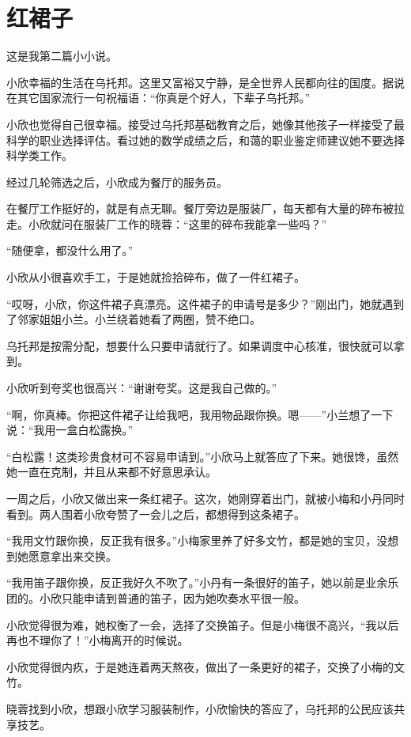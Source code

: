 \newpage
\chapter{红裙子}

\begin{quoting}
这是我第二篇小小说。
\end{quoting}

小欣幸福的生活在乌托邦。这里又富裕又宁静，是全世界人民都向往的国度。据说在其它国家流行一句祝福语：“你真是个好人，下辈子乌托邦。”

小欣也觉得自己很幸福。接受过乌托邦基础教育之后，她像其他孩子一样接受了最科学的职业选择评估。看过她的数学成绩之后，和蔼的职业鉴定师建议她不要选择科学类工作。

经过几轮筛选之后，小欣成为餐厅的服务员。

\zPar
在餐厅工作挺好的，就是有点无聊。餐厅旁边是服装厂，每天都有大量的碎布被拉走。小欣就问在服装厂工作的晓蓉：“这里的碎布我能拿一些吗？”

“随便拿，都没什么用了。”

\zPar
小欣从小很喜欢手工，于是她就捡拾碎布，做了一件红裙子。

“哎呀，小欣，你这件裙子真漂亮。这件裙子的申请号是多少？”刚出门，她就遇到了邻家姐姐小兰。小兰绕着她看了两圈，赞不绝口。

乌托邦是按需分配，想要什么只要申请就行了。如果调度中心核准，很快就可以拿到。

小欣听到夸奖也很高兴：“谢谢夸奖。这是我自己做的。”

“啊，你真棒。你把这件裙子让给我吧，我用物品跟你换。嗯——”小兰想了一下说：“我用一盒白松露换。”

“白松露！这类珍贵食材可不容易申请到。”小欣马上就答应了下来。她很馋，虽然她一直在克制，并且从来都不好意思承认。

\zPar
一周之后，小欣又做出来一条红裙子。这次，她刚穿着出门，就被小梅和小丹同时看到。两人围着小欣夸赞了一会儿之后，都想得到这条裙子。

“我用文竹跟你换，反正我有很多。”小梅家里养了好多文竹，都是她的宝贝，没想到她愿意拿出来交换。

“我用笛子跟你换，反正我好久不吹了。”小丹有一条很好的笛子，她以前是业余乐团的。小欣只能申请到普通的笛子，因为她吹奏水平很一般。

小欣觉得很为难，她权衡了一会，选择了交换笛子。但是小梅很不高兴，“我以后再也不理你了！”小梅离开的时候说。

小欣觉得很内疚，于是她连着两天熬夜，做出了一条更好的裙子，交换了小梅的文竹。

\zPar
晓蓉找到小欣，想跟小欣学习服装制作，小欣愉快的答应了，乌托邦的公民应该共享技艺。

